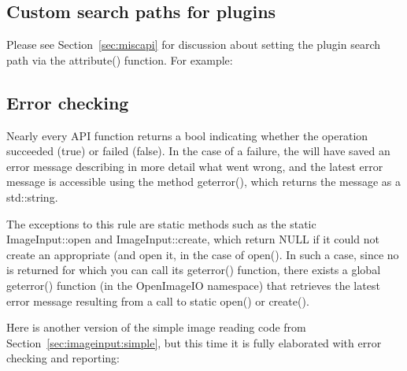 \subsection{Custom search paths for plugins}
\label{sec:imageinput:searchpaths}

Please see Section~\ref{sec:miscapi} for discussion
about setting the plugin search path via the {\cf attribute()} function.
For example:



\subsection{Error checking}
\label{sec:imageinput:errors}

Nearly every \ImageInput API function returns a {\cf bool} indicating
whether the operation succeeded ({\cf true}) or failed ({\cf false}).
In the case of a failure, the \ImageInput will have saved an error
message describing in more detail what went wrong, and the latest
error message is accessible using the \ImageInput method 
{\cf geterror()}, which returns the message as a {\cf std::string}.

The exceptions to this rule are static methods such as the static
{\cf ImageInput::open} and {\cf ImageInput::create}, which return
{\cf NULL} if it could not create an appropriate \ImageInput (and open
it, in the case of {\cf open()}.  In such a case,
since no \ImageInput is returned for which you can call its {\cf
  geterror()} function, there exists a global {\cf geterror()}
function (in the {\cf OpenImageIO} namespace) that retrieves the latest
error message resulting from a call to static {\cf open()} or {\cf create()}.

Here is another version of the simple image reading code from
Section~\ref{sec:imageinput:simple}, but this time it is fully
elaborated with error checking and reporting:

